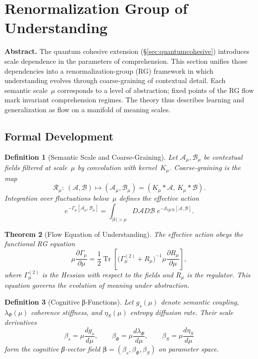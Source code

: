 \documentclass[12pt,a4paper,twoside,openright]{book}
\newtheorem{theorem}{Theorem}
\newtheorem{definition}[theorem]{Definition}
\begin{document}
\section{Renormalization Group of Understanding}
\label{sec:rgunderstanding}

\textbf{Abstract.}
The quantum cohesive extension (§\ref{sec:quantumcohesive})
introduces scale dependence in the parameters of comprehension.
This section unifies those dependencies into a renormalization-group (RG)
framework in which understanding evolves through coarse-graining
of contextual detail.
Each semantic scale~$\mu$ corresponds to a level of abstraction;
fixed points of the RG flow mark invariant comprehension regimes.
The theory thus describes learning and generalization as flow
on a manifold of meaning scales.

\subsection*{Formal Development}

\begin{definition}[Semantic Scale and Coarse-Graining]
Let $\mathcal{A}_\mu,\mathcal{B}_\mu$
be contextual fields filtered at scale~$\mu$ by convolution with kernel~$K_\mu$.
Coarse-graining is the map
\[
\mathcal{R}_\mu:\ (\mathcal{A},\mathcal{B})\longmapsto(\mathcal{A}_\mu,\mathcal{B}_\mu)
=
(K_\mu\!\ast\!\mathcal{A},\,K_\mu\!\ast\!\mathcal{B}).
\]
Integration over fluctuations below~$\mu$
defines the effective action
\[
e^{-\Gamma_\mu[\mathcal{A}_\mu,\mathcal{B}_\mu]}
=
\!\int_{|k|>\mu}\!D\mathcal{A}D\mathcal{B}\;
e^{-\mathcal{S}_{\mathrm{QCE}}[\mathcal{A},\mathcal{B}]}.
\]
\end{definition}

\begin{theorem}[Flow Equation of Understanding]
\label{thm:flow}
The effective action obeys the functional RG equation
\[
\mu\frac{\partial\Gamma_\mu}{\partial\mu}
=
\frac{1}{2}\operatorname{Tr}
\!\left[
\bigl(\Gamma_\mu^{(2)}+R_\mu\bigr)^{-1}
\mu\frac{\partial R_\mu}{\partial\mu}
\right],
\]
where $\Gamma_\mu^{(2)}$ is the Hessian with respect to the fields
and $R_\mu$ is the regulator.
This equation governs the evolution of meaning under abstraction.
\end{theorem}

\begin{definition}[Cognitive β-Functions]
Let $g_s(\mu)$ denote semantic coupling,
$\lambda_\Phi(\mu)$ coherence stiffness,
and $\eta_S(\mu)$ entropy diffusion rate.
Their scale derivatives
\[
\beta_s=\mu\frac{dg_s}{d\mu},\qquad
\beta_\Phi=\mu\frac{d\lambda_\Phi}{d\mu},\qquad
\beta_S=\mu\frac{d\eta_S}{d\mu}
\]
form the cognitive β-vector field
$\boldsymbol{\beta}=(\beta_s,\beta_\Phi,\beta_S)$
on parameter space.
\end{definition}
\end{document}

